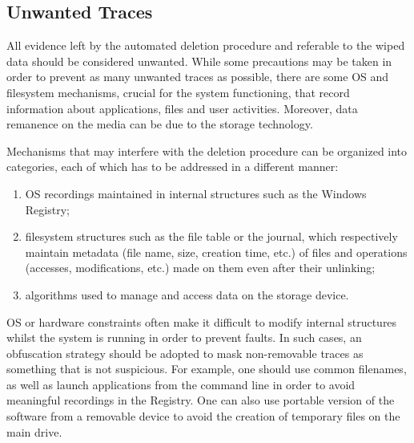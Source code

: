 \documentclass[conference]{IEEEtran}
\begin{document}
\subsection{Unwanted Traces}
All evidence left by the automated deletion procedure and referable to the wiped data should be considered unwanted.
While some precautions may be taken in order to prevent as many unwanted traces as possible, there are some OS and filesystem mechanisms, crucial for the system functioning, that record information about applications, files and user activities. Moreover,
data remanence on the media can be due to the storage technology.

Mechanisms that may interfere with the deletion procedure can be organized into categories, each of which has to be addressed in a different manner:
\begin{enumerate}
 \item OS recordings maintained in internal structures such as the Windows Registry;
 \item filesystem structures such as the file table or the journal, which respectively maintain metadata (file name, size, creation time, etc.) of files and operations (accesses, modifications, etc.) made on them even after their unlinking;
 \item algorithms used to manage and access data on the storage device.
\end{enumerate}

OS or hardware constraints often make it difficult to modify internal structures whilst the system is running in order to prevent faults. In such cases, an obfuscation strategy should be adopted to mask non-removable traces as something that is not suspicious. For example, one should use common filenames, as well as launch applications from the command line in order to avoid meaningful recordings in the Registry. One can also use portable version of the software from a removable device to avoid the creation of temporary files on the main drive.
\end{document}
